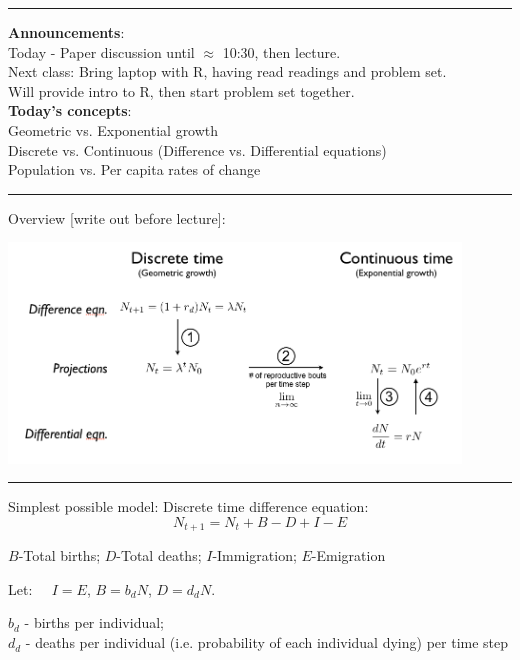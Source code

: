 \documentclass{article}
\newcommand{\note}[1]{\colorbox{gray!20}{#1}}
\newcommand*\circled[1]{\tikz[baseline=(char.base)]{
            \node[shape=circle,draw,inner sep=2pt] (char) {#1};}}
\begin{document}
\noindent{}

\rule[0.5ex]{\linewidth}{1pt}
\textbf{Announcements}: \\
Today - Paper discussion until $\approx$ 10:30, then lecture.\\
Next class: Bring laptop with R, having read readings and problem set. \\
Will provide intro to R, then start problem set together.\\

\textbf{Today's concepts}: \\
Geometric vs. Exponential growth \\
Discrete vs. Continuous (Difference vs. Differential equations) \\
Population vs. Per capita rates of change

\rule[0.5ex]{\linewidth}{1pt}
Overview \note{[write out before lecture]}:
\begin{center}
\includegraphics[width=12cm]{figs/EqnConnections.png}
\end{center}
\rule[0.5ex]{\linewidth}{1pt}

\circled{1}
Simplest possible model: Discrete time difference equation:  
\begin{equation*}
N_{t+1}=N_t+B-D+I-E
\end{equation*}
\begin{center}
$B$-Total births; $D$-Total deaths; $I$-Immigration; $E$-Emigration
\end{center}

Let: $\;\;\;\ I=E$, $B=b_d N$, $D=d_d N$.
\begin{center}
	$b_d$ - births per individual; \\$d_d$ - deaths per individual (i.e. probability of each individual dying) per time step
\end{center}
\end{document}
